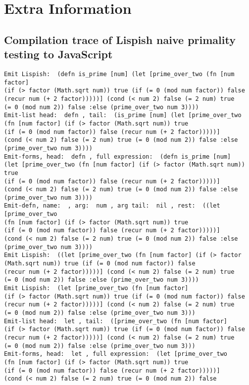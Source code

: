 \chapter{Extra Information}
\section{Compilation trace of Lispish naive primality testing to JavaScript}\label{primality-trace-appendix}
\begin{verbatim}
Emit Lispish:  (defn is_prime [num] (let [prime_over_two (fn [num factor] 
(if (> factor (Math.sqrt num)) true (if (= 0 (mod num factor)) false 
(recur num (+ 2 factor)))))] (cond (< num 2) false (= 2 num) true 
(= 0 (mod num 2)) false :else (prime_over_two num 3))))
Emit-list head:  defn , tail:  (is_prime [num] (let [prime_over_two 
(fn [num factor] (if (> factor (Math.sqrt num)) true 
(if (= 0 (mod num factor)) false (recur num (+ 2 factor)))))] 
(cond (< num 2) false (= 2 num) true (= 0 (mod num 2)) false :else 
(prime_over_two num 3))))
Emit-forms, head:  defn , full expression:  (defn is_prime [num] 
(let [prime_over_two (fn [num factor] (if (> factor (Math.sqrt num)) true 
(if (= 0 (mod num factor)) false (recur num (+ 2 factor)))))] 
(cond (< num 2) false (= 2 num) true (= 0 (mod num 2)) false :else 
(prime_over_two num 3))))
Emit-defn, name:  , arg:  num , arg tail:  nil , rest:  ((let [prime_over_two 
(fn [num factor] (if (> factor (Math.sqrt num)) true 
(if (= 0 (mod num factor)) false (recur num (+ 2 factor)))))] 
(cond (< num 2) false (= 2 num) true (= 0 (mod num 2)) false :else 
(prime_over_two num 3))))
Emit Lispish:  ((let [prime_over_two (fn [num factor] (if (> factor 
(Math.sqrt num)) true (if (= 0 (mod num factor)) false 
(recur num (+ 2 factor)))))] (cond (< num 2) false (= 2 num) true 
(= 0 (mod num 2)) false :else (prime_over_two num 3))))
Emit Lispish:  (let [prime_over_two (fn [num factor] 
(if (> factor (Math.sqrt num)) true (if (= 0 (mod num factor)) false 
(recur num (+ 2 factor)))))] (cond (< num 2) false (= 2 num) true 
(= 0 (mod num 2)) false :else (prime_over_two num 3)))
Emit-list head:  let , tail:  ([prime_over_two (fn [num factor] 
(if (> factor (Math.sqrt num)) true (if (= 0 (mod num factor)) false 
(recur num (+ 2 factor)))))] (cond (< num 2) false (= 2 num) true 
(= 0 (mod num 2)) false :else (prime_over_two num 3)))
Emit-forms, head:  let , full expression:  (let [prime_over_two 
(fn [num factor] (if (> factor (Math.sqrt num)) true 
(if (= 0 (mod num factor)) false (recur num (+ 2 factor)))))] 
(cond (< num 2) false (= 2 num) true (= 0 (mod num 2)) false 

\end{verbatim}
